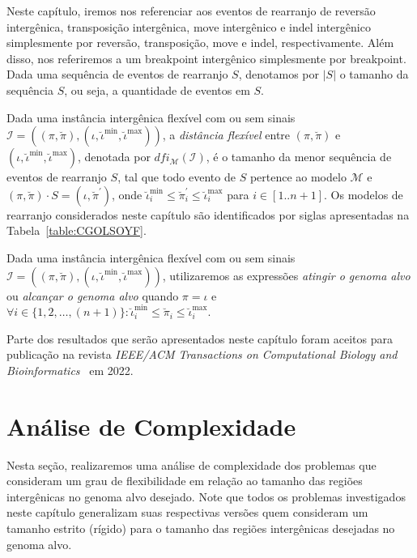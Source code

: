 Neste capítulo, iremos nos referenciar aos eventos de rearranjo de reversão intergênica, transposição intergênica, move intergênico e indel intergênico simplesmente por reversão, transposição, move e indel, respectivamente. Além disso, nos referiremos a um breakpoint intergênico simplesmente por breakpoint. Dada uma sequência de eventos de rearranjo $S$, denotamos por $|S|$ o tamanho da sequência $S$, ou seja, a quantidade de eventos em $S$.

Dada uma instância intergênica flexível com ou sem sinais $\mathcal{I} = ((\pi,\breve\pi),(\iota,\breve\iota^{\min},\breve\iota^{\max}))$, a \emph{distância flexível} entre $(\pi,\breve\pi)$ e $(\iota,\breve\iota^{\min},\breve\iota^{\max})$, denotada por $dfi_{\mathcal{M}}(\mathcal{I})$, é o tamanho da menor sequência de eventos de rearranjo $S$, tal que todo evento de $S$ pertence ao modelo $\mathcal{M}$ e $(\pi,\breve\pi) \cdot S = (\iota,\breve\pi^{\prime})$, onde $\breve\iota^{\min}_i \le \breve\pi^{\prime}_i \le \breve\iota^{\max}_i$ para $i \in [1..n+1]$. Os modelos de rearranjo considerados neste capítulo são identificados por siglas apresentadas na Tabela~\ref{table:CGOLSOYF}.



Dada uma instância intergênica flexível com ou sem sinais $\mathcal{I} = ((\pi,\breve\pi),(\iota,\breve\iota^{\min},\breve\iota^{\max}))$, utilizaremos as expressões \emph{atingir o genoma alvo} ou \emph{alcançar o genoma alvo} quando $\pi = \iota$ e $\forall i \in \{1,2,\dots,({n+1})\}: \breve\iota^{\min}_i \le \breve\pi_i \le \breve\iota^{\max}_i$.

Parte dos resultados que serão apresentados neste capítulo foram aceitos para publicação na revista \emph{IEEE/ACM Transactions on Computational Biology and Bioinformatics}~\cite{2022a-brito-etal} em 2022.

\section{Análise de Complexidade}

Nesta seção, realizaremos uma análise de complexidade dos problemas que consideram um grau de flexibilidade em relação ao tamanho das regiões intergênicas no genoma alvo desejado. Note que todos os problemas investigados neste capítulo generalizam suas respectivas versões quem consideram um tamanho estrito (rígido) para o tamanho das regiões intergênicas desejadas no genoma alvo.

